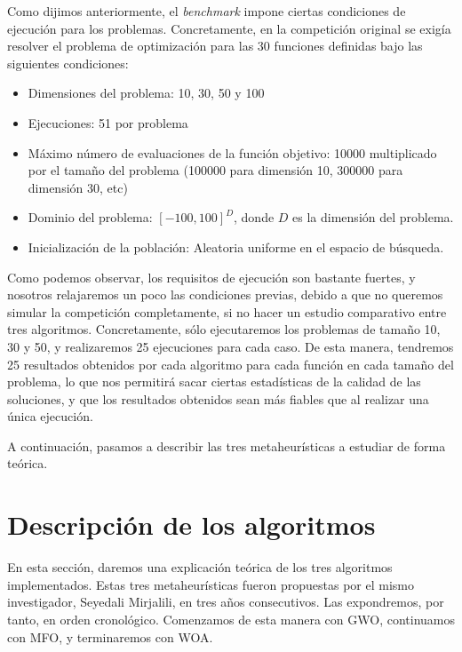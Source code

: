 \documentclass[
  a4paper,
,tablecaptionabove
]{scrartcl}
\providecommand{\tightlist}{%
  \setlength{\itemsep}{0pt}\setlength{\parskip}{0pt}}
\begin{document}
Como dijimos anteriormente, el \emph{benchmark} impone ciertas
condiciones de ejecución para los problemas. Concretamente, en la
competición original se exigía resolver el problema de optimización para
las 30 funciones definidas bajo las siguientes condiciones:

\begin{itemize}
\tightlist
\item
  Dimensiones del problema: 10, 30, 50 y 100
\item
  Ejecuciones: 51 por problema
\item
  Máximo número de evaluaciones de la función objetivo: 10000
  multiplicado por el tamaño del problema (100000 para dimensión 10,
  300000 para dimensión 30, etc)
\item
  Dominio del problema: \([-100, 100]^D\), donde \(D\) es la dimensión
  del problema.
\item
  Inicialización de la población: Aleatoria uniforme en el espacio de
  búsqueda.
\end{itemize}

Como podemos observar, los requisitos de ejecución son bastante fuertes,
y nosotros relajaremos un poco las condiciones previas, debido a que no
queremos simular la competición completamente, si no hacer un estudio
comparativo entre tres algoritmos. Concretamente, sólo ejecutaremos los
problemas de tamaño 10, 30 y 50, y realizaremos 25 ejecuciones para cada
caso. De esta manera, tendremos 25 resultados obtenidos por cada
algoritmo para cada función en cada tamaño del problema, lo que nos
permitirá sacar ciertas estadísticas de la calidad de las soluciones, y
que los resultados obtenidos sean más fiables que al realizar una única
ejecución.

A continuación, pasamos a describir las tres metaheurísticas a estudiar
de forma teórica.

\hypertarget{descripciuxf3n-de-los-algoritmos}{%
\section{Descripción de los
algoritmos}\label{descripciuxf3n-de-los-algoritmos}}

En esta sección, daremos una explicación teórica de los tres algoritmos
implementados. Estas tres metaheurísticas fueron propuestas por el mismo
investigador, Seyedali Mirjalili, en tres años consecutivos. Las
expondremos, por tanto, en orden cronológico. Comenzamos de esta manera
con GWO, continuamos con MFO, y terminaremos con WOA.
\end{document}
